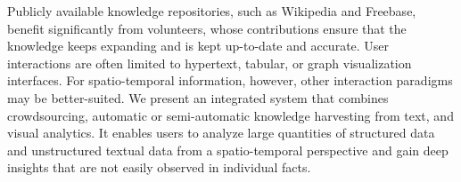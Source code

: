 Publicly available knowledge repositories, such as Wikipedia and Freebase, benefit significantly from volunteers, whose contributions ensure that the knowledge keeps expanding and is kept up-to-date and accurate. User interactions are often limited to hypertext, tabular, or graph visualization interfaces. For spatio-temporal information, however, other interaction paradigms may be better-suited. We present an integrated system that combines crowdsourcing, automatic or semi-automatic knowledge harvesting from text, and visual analytics. It enables users to analyze large quantities of structured data and unstructured textual data from a spatio-temporal perspective and gain deep insights that are not easily observed in individual facts.
